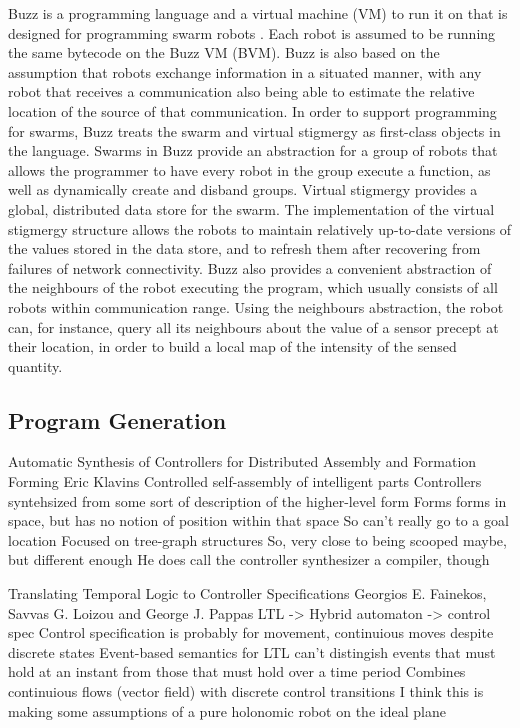Buzz is a programming language and a virtual machine (VM) to run it on that is designed for programming swarm robots \cite{PinciroliLB15}. 
Each robot is assumed to be running the same bytecode on the Buzz VM (BVM). 
Buzz is also based on the assumption that robots exchange information in a situated manner, with any robot that receives a communication also being able to estimate the relative location of the source of that communication.
In order to support programming for swarms, Buzz treats the swarm and virtual stigmergy as first-class objects in the language. 
Swarms in Buzz provide an abstraction for a group of robots that allows the programmer to have every robot in the group execute a function, as well as dynamically create and disband groups. 
Virtual stigmergy provides a global, distributed data store for the swarm. 
The implementation of the virtual stigmergy structure allows the robots to maintain relatively up-to-date versions of the values stored in the data store, and to refresh them after recovering from failures of network connectivity.
Buzz also provides a convenient abstraction of the neighbours of the robot executing the program, which usually consists of all robots within communication range. 
Using the neighbours abstraction, the robot can, for instance, query all its neighbours about the value of a sensor precept at their location, in order to build a local map of the intensity of the sensed quantity. 

\subsection{Program Generation}
Automatic Synthesis of Controllers for Distributed Assembly and Formation Forming
Eric Klavins
	Controlled self-assembly of intelligent parts
	Controllers syntehsized from some sort of description of the higher-level form
	Forms forms in space, but has no notion of position within that space
		So can't really go to a goal location
	Focused on tree-graph structures
	So, very close to being scooped maybe, but different enough 
		He does call the controller synthesizer a compiler, though

Translating Temporal Logic to Controller Specifications
Georgios E. Fainekos, Savvas G. Loizou and George J. Pappas
	LTL -> Hybrid automaton -> control spec
	Control specification is probably for movement, continuious moves despite discrete states
	Event-based semantics for LTL can't distingish events that must hold at an instant from those that must hold over a time period
	Combines continuious flows (vector field) with discrete control transitions
	I think this is making some assumptions of a pure holonomic robot on the ideal plane
	
